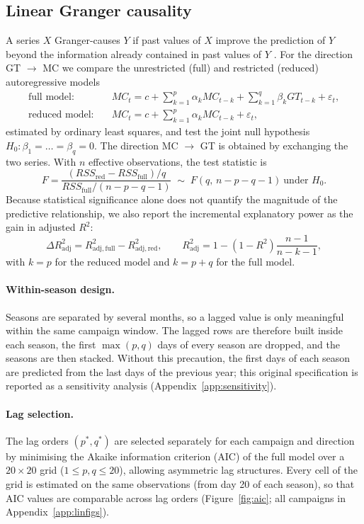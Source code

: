 \documentclass[11pt,a4paper]{article}
\begin{document}
\subsection{Linear Granger causality}\label{sec:linear}
A series $X$ Granger-causes $Y$ if past values of $X$ improve the prediction of $Y$ beyond the information already contained in past values of $Y$ \cite{granger1969}. For the direction GT $\to$ MC we compare the unrestricted (full) and restricted (reduced) autoregressive models
\begin{align}
\text{full model:}\quad & MC_t = c + \sum_{k=1}^{p}\alpha_k MC_{t-k} + \sum_{k=1}^{q}\beta_k GT_{t-k} + \varepsilon_t,\\
\text{reduced model:}\quad & MC_t = c + \sum_{k=1}^{p}\alpha_k MC_{t-k} + \varepsilon_t,
\end{align}
estimated by ordinary least squares, and test the joint null hypothesis $H_0:\beta_1=\dots=\beta_q=0$. The direction MC $\to$ GT is obtained by exchanging the two series. With $n$ effective observations, the test statistic is
\begin{equation}
F=\frac{(RSS_{\mathrm{red}}-RSS_{\mathrm{full}})/q}{RSS_{\mathrm{full}}/(n-p-q-1)}\;\sim\;F(q,\,n-p-q-1)\ \text{under } H_0.
\end{equation}
Because statistical significance alone does not quantify the magnitude of the predictive relationship, we also report the incremental explanatory power as the gain in adjusted $R^2$:
\begin{equation}
\Delta R^2_{\mathrm{adj}} = R^2_{\mathrm{adj,full}} - R^2_{\mathrm{adj,red}},\qquad
R^2_{\mathrm{adj}} = 1-(1-R^2)\frac{n-1}{n-k-1},
\end{equation}
with $k=p$ for the reduced model and $k=p+q$ for the full model.

\paragraph{Within-season design.} Seasons are separated by several months, so a lagged value is only meaningful within the same campaign window. The lagged rows are therefore built inside each season, the first $\max(p,q)$ days of every season are dropped, and the seasons are then stacked. Without this precaution, the first days of each season are predicted from the last days of the previous year; this original specification is reported as a sensitivity analysis (Appendix~\ref{app:sensitivity}).

\paragraph{Lag selection.} The lag orders $(p^*,q^*)$ are selected separately for each campaign and direction by minimising the Akaike information criterion (AIC) \cite{akaike1974} of the full model over a $20\times20$ grid ($1\le p,q\le 20$), allowing asymmetric lag structures. Every cell of the grid is estimated on the same observations (from day 20 of each season), so that AIC values are comparable across lag orders (Figure~\ref{fig:aic}; all campaigns in Appendix~\ref{app:linfigs}).
\end{document}
